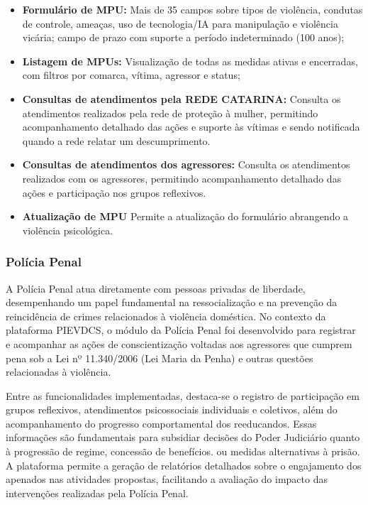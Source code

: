 \begin{itemize}
   \item \textbf{Formulário de MPU:} Mais de 35 campos sobre tipos de violência, condutas de controle, ameaças, uso de tecnologia/IA para manipulação e violência vicária; campo de prazo com suporte a período indeterminado (100 anos);
   \item \textbf{Listagem de MPUs:} Visualização de todas as medidas ativas e encerradas, com filtros por comarca, vítima, agressor e status;
   \item \textbf{Consultas de atendimentos pela REDE CATARINA:} Consulta os atendimentos realizados pela rede de proteção à mulher, permitindo acompanhamento detalhado das ações e suporte às vítimas e sendo notificada quando a rede relatar um descumprimento.
   \item \textbf{Consultas de atendimentos dos agressores:} Consulta os atendimentos realizados com os agressores, permitindo acompanhamento detalhado das ações e participação nos grupos reflexivos.
   \item \textbf{Atualização de MPU} Permite a atualização do formulário abrangendo a violência psicológica.
\end{itemize}

\subsubsection{Polícia Penal}
\par A Polícia Penal atua diretamente com pessoas privadas de liberdade, desempenhando um papel fundamental na ressocialização e na prevenção da reincidência de crimes relacionados à violência doméstica. No contexto da plataforma PIEVDCS, o módulo da Polícia Penal foi desenvolvido para registrar e acompanhar as ações de conscientização voltadas aos agressores que cumprem pena sob a Lei nº 11.340/2006 (Lei Maria da Penha) e outras questões relacionadas à violência.

\par Entre as funcionalidades implementadas, destaca-se o registro de participação em grupos reflexivos, atendimentos psicossociais individuais e coletivos, além do acompanhamento do progresso comportamental dos reeducandos. Essas informações são fundamentais para subsidiar decisões do Poder Judiciário quanto à progressão de regime, concessão de benefícios. ou medidas alternativas à prisão. A plataforma permite a geração de relatórios detalhados sobre o engajamento dos apenados nas atividades propostas, facilitando a avaliação do impacto das intervenções realizadas pela Polícia Penal.

